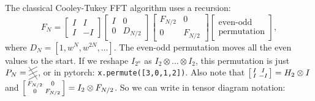 The classical Cooley-Tukey FFT algorithm uses a recursion:
\[
F_N =
\begin{bmatrix}
I & I \\
I & -I
\end{bmatrix}
\begin{bmatrix}
I & 0 \\
0 & D_{N/2}
\end{bmatrix}
\begin{bmatrix}
F_{N/2} & 0 \\
0 & F_{N/2}
\end{bmatrix}
\begin{bmatrix}
\text{even-odd} \\
\text{permutation}
\end{bmatrix}
,
\]
where $D_N = [1, w^N, w^{2N}, \dots]$.
The even-odd permutation moves all the even values to the start.
If we reshape $I_{2^n}$ as $I_2\otimes\dots\otimes I_2$, this permutation is just
$
P_N = \begin{tikzpicture}[baseline=.5em, x=1em, y=.5em]
    \draw (0,0) -- (1, 1);
    \draw (0,1) -- (1, 2);
    \draw (0,2) -- (1, 3);
    \draw (0,3) -- (1, 0);
\end{tikzpicture}
$,
or in pytorch: \texttt{x.permute([3,0,1,2])}.
Also note that
$\left[\begin{smallmatrix}I&I\\I&-I\end{smallmatrix}\right] = H_2 \otimes I$ and $\left[\begin{smallmatrix}F_{N/2} & 0\\0&F_{N/2}\end{smallmatrix}\right]=I_2 \otimes F_{N/2}$.
So we can write in tensor diagram notation:
